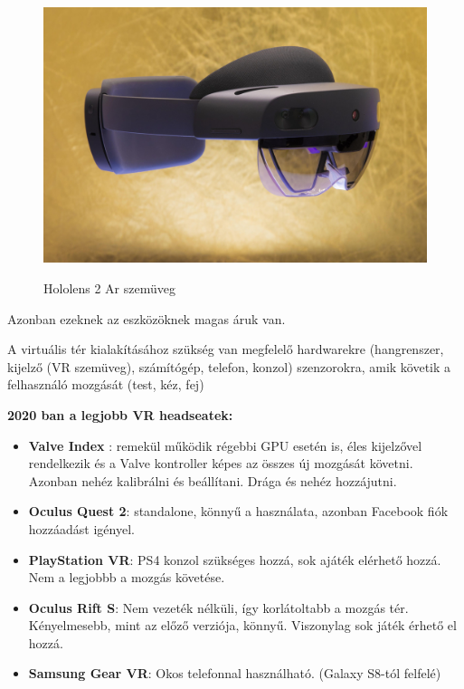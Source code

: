 \begin{figure}[htp]
    \centering
   	\includegraphics[width=5truecm, height=3.8truecm]{images/holo.jpg}
	\caption{Hololens 2 Ar szemüveg}
	\cite{hololens}
\end{figure}

Azonban ezeknek az eszközöknek magas áruk van. 


A virtuális tér kialakításához szükség van megfelelő hardwarekre (hangrenszer, kijelző (VR szemüveg), számítógép, telefon, konzol) szenzorokra, amik követik a felhasználó mozgását (test, kéz, fej)

{\bf 2020\- ban a legjobb VR headseatek:}
\begin{itemize}
\item {\bf Valve Index} : remekül működik régebbi GPU esetén is, éles kijelzővel rendelkezik és a Valve kontroller képes az összes új mozgását követni. Azonban nehéz kalibrálni és beállítani. Drága és nehéz hozzájutni.
\item {\bf Oculus Quest 2}: standalone, könnyű a használata, azonban Facebook fiók hozzáadást igényel.
\item {\bf PlayStation VR}: PS4 konzol szükséges hozzá, sok ajáték elérhető hozzá. Nem a legjobbb a mozgás követése.
\item {\bf Oculus Rift S}: Nem vezeték nélküli, így korlátoltabb a mozgás tér.  Kényelmesebb, mint az előző verziója, könnyű. Viszonylag sok játék érhető el hozzá.
\item {\bf Samsung Gear VR}: Okos telefonnal használható. (Galaxy S8-tól felfelé)  \cite{vrheadset}
\end{itemize}

